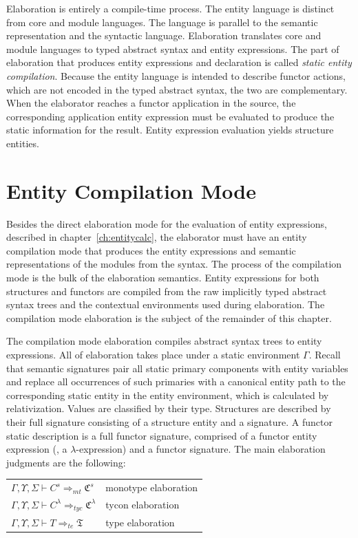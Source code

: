 Elaboration is entirely a compile-time process. The entity language is distinct from core and module languages. The language is parallel to the semantic representation and the syntactic language. Elaboration translates core and module languages to typed abstract syntax and entity expressions. The part of elaboration that produces entity expressions and declaration is called \emph{static entity compilation}. Because the entity language is intended to describe functor actions, which are not encoded in the typed abstract syntax, the two are complementary. When the elaborator reaches a functor application in the source, the corresponding application entity expression must be evaluated to produce the static information for the result. Entity expression evaluation yields structure entities. 
   
\section{Entity Compilation Mode}
Besides the direct elaboration mode for the evaluation of entity expressions, described in chapter~\ref{ch:entitycalc}, the elaborator must have an entity compilation mode that produces the entity expressions and semantic representations of the modules from the syntax. The process of the compilation mode is the bulk of the elaboration semantics. Entity expressions for both structures and functors are compiled from the raw implicitly typed abstract syntax trees and the contextual environments used during elaboration. The compilation mode elaboration is the subject of the remainder of this chapter. 

The compilation mode elaboration compiles abstract
syntax trees to entity expressions. All of elaboration takes place
under a static environment $\Gamma$. Recall that semantic
signatures pair all static primary components with entity variables
and replace all occurrences of such primaries with a canonical entity path to the corresponding static entity in the entity environment, which is calculated by relativization. Values are classified by their type. Structures are described by their full signature consisting of a structure entity and a signature. A functor static description is a full functor signature, comprised of a functor entity expression (\ie, a $\lambda$-expression) and a functor signature. The main elaboration judgments are the following:\\[-5mm]
 
\begin{tabular}{ll}
        $\Gamma,\Upsilon,\Sigma\vdash C^s \Rightarrow_{mt} \mathfrak{C}^s$ & monotype elaboration\\
        $\Gamma,\Upsilon,\Sigma\vdash C^\lambda \Rightarrow_{tyc} \mathfrak{C}^\lambda$ & tycon elaboration\\
        $\Gamma,\Upsilon,\Sigma\vdash T \Rightarrow_{te} \mathfrak{T}$ & type elaboration\\
\end{tabular}\\

